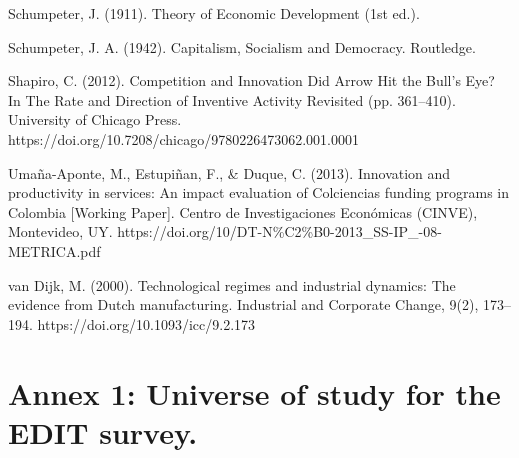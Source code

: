 \documentclass[12pt,a4paper]{article}
\begin{document}
{Schumpeter, J. (1911). Theory of Economic Development (1st ed.).

Schumpeter, J. A. (1942). Capitalism, Socialism and Democracy. Routledge.

Shapiro, C. (2012). Competition and Innovation Did Arrow Hit the Bull’s Eye? In The Rate and Direction of Inventive Activity Revisited (pp. 361–410). University of Chicago Press. https://doi.org/10.7208/chicago/9780226473062.001.0001

Umaña-Aponte, M., Estupiñan, F., \& Duque, C. (2013). Innovation and productivity in services: An impact evaluation of Colciencias funding programs in Colombia [Working Paper]. Centro de Investigaciones Económicas (CINVE), Montevideo, UY. https://doi.org/10/DT-N\%C2\%B0-2013\_SS-IP\_-08-METRICA.pdf

van Dijk, M. (2000). Technological regimes and industrial dynamics: The evidence from Dutch manufacturing. Industrial and Corporate Change, 9(2), 173–194. https://doi.org/10.1093/icc/9.2.173






\pagebreak
\appendix
\section{Annex 1: Universe of study for the EDIT survey.}

}
\end{document}
